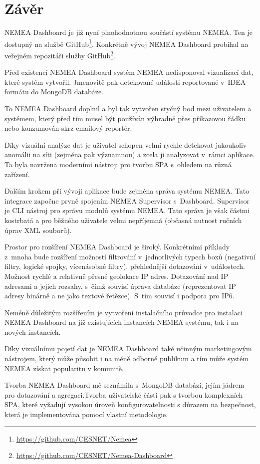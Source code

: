 \chapter{Závěr}

NEMEA Dashboard je již nyní plnohodnotnou součástí systému NEMEA. Ten je dostupný na službě GitHub\footnote{\url{https://github.com/CESNET/Nemea}}. Konkrétně vývoj NEMEA Dashboard probíhal na veřejném repozitáři služby GitHub\footnote{\url{https://github.com/CESNET/Nemea-Dashboard}}.

Před existencí NEMEA Dashboard systém NEMEA nedisponoval vizualizací dat, které systém vytvořil. Jmenovitě pak detekované události reportované v~IDEA formátu do MongoDB databáze.

To NEMEA Dashboard doplnil a byl tak vytvořen styčný bod mezi uživatelem a systémem, který před tím musel být používán výhradně přes příkazovou řádku nebo konzumován skrz emailový reportér.

Díky vizuální analýze dat je uživatel schopen velmi rychle detekovat jakoukoliv anomálii na síti (zejména pak významnou) a zcela ji analyzovat v~rámci aplikace. Ta byla navržena moderními nástroji pro tvorbu SPA s~ohledem na různá zařízení.

Dalším krokem při vývoji aplikace bude zejména správa systému NEMEA. Tato integrace započne prvně spojením NEMEA Supervisor s~Dashboard. Supervisor je CLI nástroj pro správu modulů systému NEMEA. Tato správa je však částmi kostrbatá a pro běžného uživatele velmi nepříjemná (občasná nutnost ručních úprav XML souborů).

Prostor pro rozšíření NEMEA Dashboard je široký. Konkrétními příklady z~mnoha bude rozšíření možností filtrování v~jednotlivých typech boxů (negativní filtry, logické spojky, vícenásobné filtry), přehlednější dotazování v~událostech. Možnost rychlé a relativně přesné geolokace IP adres. Dotazování nad IP adresami a jejich rozsahy, s~čímž souvisí úprava databáze (reprezentovat IP adresy binárně a ne jako textové řetězce). S~tím souvisí i podpora pro IP6.

Neméně důležitým rozšířením je vytvoření instalačního průvodce pro instalaci NEMEA Dashboard na již existujících instancích NEMEA systému, tak i na nových instancích.

Díky vizuálnímu pojetí dat je NEMEA Dashboard také učinným marketingovým nástrojem, který může působit i na méně odborné publikum a tím může systém NEMEA získat popularitu v komunitě.

Tvorba NEMEA Dashboard mě seznámila s~MongoDB databází, jejím jádrem pro dotazování a agregaci.Tvorba uživatelské části pak s tvorbou komplexních SPA, které vyžadují vysokou úroveň konfigurovatelnosti s důrazem na bezpečnost, která je implementována pomocí vlastní metodologie.
